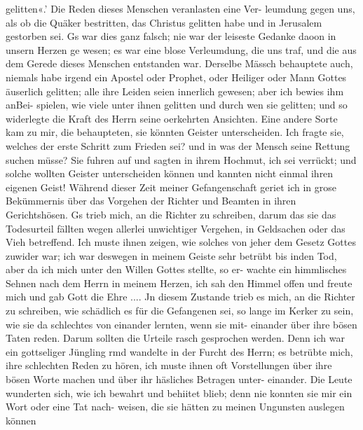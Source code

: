 gelitten«.' Die Reden dieses Menschen veranlasten eine Ver-
leumdung gegen uns, als ob die Quäker bestritten, das Christus
gelitten habe und in Jerusalem gestorben sei. Gs war dies ganz
falsch; nie war der leiseste Gedanke daoon in unsern Herzen ge
wesen; es war eine blose Verleumdung, die uns traf, und die
aus dem Gerede dieses Menschen entstanden war. Derselbe
Mässch behauptete auch, niemals habe irgend ein Apostel oder
Prophet, oder Heiliger oder Mann Gottes äuserlich gelitten; alle
ihre Leiden seien innerlich gewesen; aber ich bewies ihm anBei-
spielen, wie viele unter ihnen gelitten und durch wen sie gelitten;
und so widerlegte die Kraft des Herrn seine oerkehrten Ansichten.
Eine andere Sorte kam zu mir, die behaupteten, sie könnten
Geister unterscheiden. Ich fragte sie, welches der erste Schritt
zum Frieden sei? und in was der Mensch seine Rettung suchen
müsse? Sie fuhren auf und sagten in ihrem Hochmut, ich sei
verrückt; und solche wollten Geister unterscheiden können und
kannten nicht einmal ihren eigenen Geist!
Während dieser Zeit meiner Gefangenschaft geriet ich in
grose Bekümmernis über das Vorgehen der Richter und Beamten
in ihren Gerichtshösen. Gs trieb mich, an die Richter zu schreiben,
darum das sie das Todesurteil fällten wegen allerlei unwichtiger
Vergehen, in Geldsachen oder das Vieh betreffend. Ich muste
ihnen zeigen, wie solches von jeher dem Gesetz Gottes zuwider
war; ich war deswegen in meinem Geiste sehr betrübt bis inden
Tod, aber da ich mich unter den Willen Gottes stellte, so er-
wachte ein himmlisches Sehnen nach dem Herrn in meinem Herzen,
ich sah den Himmel offen und freute mich und gab Gott die
Ehre ....
Jn diesem Zustande trieb es mich, an die Richter zu schreiben,
wie schädlich es für die Gefangenen sei, so lange im Kerker zu
sein, wie sie da schlechtes von einander lernten, wenn sie mit-
einander über ihre bösen Taten reden. Darum sollten die Urteile
rasch gesprochen werden. Denn ich war ein gottseliger Jüngling
rmd wandelte in der Furcht des Herrn; es betrübte mich, ihre
schlechten Reden zu hören, ich muste ihnen oft Vorstellungen über
ihre bösen Worte machen und über ihr häsliches Betragen unter-
einander. Die Leute wunderten sich, wie ich bewahrt und behiitet
blieb; denn nie konnten sie mir ein Wort oder eine Tat nach-
weisen, die sie hätten zu meinen Ungunsten auslegen können


